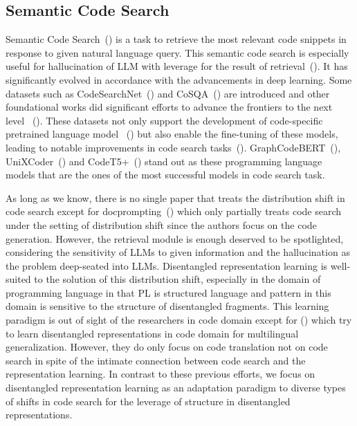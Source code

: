 \subsection{Semantic Code Search}
Semantic Code Search~(\cite{GuZ018,CambroneroLKS019}) is a task to retrieve the most relevant code snippets 
in response to given natural language query.
This semantic code search is especially useful for hallucination of LLM with leverage for the result of 
retrieval~(\cite{ChenYJSKRJT24,ShiqiMJZTSJ24}). 
It has significantly evolved in accordance with the advancements in deep learning.
Some datasets such as CodeSearchNet~(\cite{HusainWGAB19}) and CoSQA~(\cite{HuangTSG0J0D20}) are introduced 
and other foundational works did significant efforts to advance the frontiers to the next level
~(\cite{EnshenYWLHSDH23, HaochenXAC23, Haochen24}).
These datasets not only support the development of code-specific pretrained language model 
~(\cite{GuoRLFT0ZDSFTDC21, FengGTDFGS0LJZ20, WangWJH21, GuoLDW0022, WangLGB0H23}) but also enable the fine-tuning of these models, 
leading to notable improvements in code search tasks~(\cite{GuoLDW0022, WangLGB0H23}). 
GraphCodeBERT~(\cite{FengGTDFGS0LJZ20}), UniXCoder~(\cite{GuoLDW0022}) and CodeT5+~(\cite{WangLGB0H23}) stand out 
as these programming language models that are the ones of the most successful models in code search task.

As long as we know, there is no single paper that 
treats the distribution shift in code search except for docprompting~(\cite{Zhou0XJN23}) 
which only partially treats code search under the setting of distribution shift 
since the authors focus on the code generation.
However, the retrieval module is enough deserved to be spotlighted, 
considering the sensitivity of LLMs to given information and the hallucination as the problem deep-seated into LLMs.
Disentangled representation learning is well-suited to the solution of this distribution shift, 
especially in the domain of programming language 
in that PL is structured language and pattern in this domain is sensitive to the structure of disentangled fragments.
This learning paradigm is out of sight of the researchers in code domain 
except for (\cite{ZhangHZWLS21}) which try to learn disentangled representations in code domain for multilingual generalization.
However, they do only focus on code translation not on code search 
in spite of the intimate connection between code search and the representation learning.
In contrast to these previous efforts, 
we focus on disentangled representation learning as an adaptation paradigm 
to diverse types of shifts in code search for the leverage of structure in disentangled representations.

